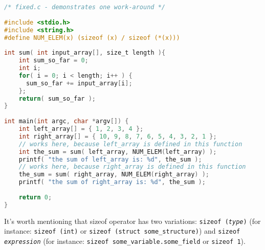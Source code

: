 \lstset{basicstyle=\scriptsize, numbers=left, captionpos=b, tabsize=4}
\begin{lstlisting}[caption=Section \thesection listing \arabic{pntcnt},language={C},
breaklines=true,xleftmargin=15pt,label=lst:section\thesection listing\arabic{pntcnt}]
/* fixed.c - demonstrates one work-around */
 
#include <stdio.h>
#include <string.h>
#define NUM_ELEM(x) (sizeof (x) / sizeof (*(x)))
 
int sum( int input_array[], size_t length ){
	int sum_so_far = 0;
	int i;
	for( i = 0; i < length; i++ ) {
	  sum_so_far += input_array[i];
	};
	return( sum_so_far );
}
 
int main(int argc, char *argv[]) {
	int left_array[] = { 1, 2, 3, 4 };
	int right_array[] = { 10, 9, 8, 7, 6, 5, 4, 3, 2, 1 };
	// works here, because left_array is defined in this function
	int the_sum = sum( left_array, NUM_ELEM(left_array) ); 
	printf( "the sum of left_array is: %d", the_sum );
	// works here, because right_array is defined in this function
	the_sum = sum( right_array, NUM_ELEM(right_array) ); 
	printf( "the sum of right_array is: %d", the_sum );
	
	return 0;
}
\end{lstlisting}

It's worth mentioning that sizeof operator has two variations: \texttt{sizeof
(\emph{type})} (for instance: \texttt{sizeof (int)} or \texttt{sizeof (struct
some\_structure)}) and \texttt{sizeof \emph{expression}} (for instance:
\texttt{sizeof some\_variable.some\_field} or \texttt{sizeof 1}).
